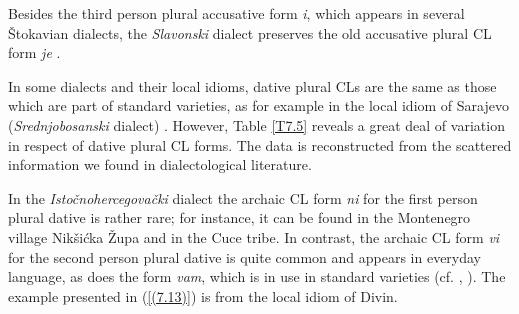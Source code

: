 \noindent Besides the third person plural accusative form \textit{i}, which appears in several Štokavian dialects, the \textit{Slavonski} dialect preserves the old accusative plural CL form \textit{je} \citep[cf.][48]{FarkasBabic11}. 


In some dialects and their local idioms, dative plural CLs are the same as those which are part of standard varieties, as for example in the local idiom of Sarajevo (\textit{Srednjobosanski} dialect) \citep[cf.][58]{HTS09}. However, Table \ref{T7.5} reveals a great deal of variation in respect of dative plural CL forms. The data is reconstructed from the scattered information we found in dialectological literature. 

\begin{table}
\caption{CL forms of the plural pronouns in the dative\label{T7.5}}
\end{table}


In the \textit{Istočnohercegovački} dialect the archaic CL form \textit{ni} for the first person plural dative is rather rare; for instance, it can be found in the Montenegro village Nikšićka Župa and in the Cuce tribe. In contrast, the archaic CL form \textit{vi} for the second person plural dative is quite common and appears in everyday language, as does the form \textit{vam}, which is in use in standard varieties (cf. \citealt[152]{Pesikan65}, \citealt[196f]{Peco07a}). The example presented in (\ref{(7.13)}) is from the local idiom of Divin.


